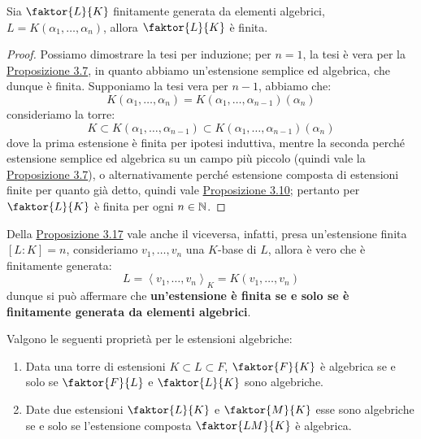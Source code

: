 \documentclass[11pt]{scrartcl}
\begin{document}
\begin{proposition}
    \label{3.17}
    Sia $\faktor{L}{K}$ finitamente generata da elementi algebrici, $L = K(\alpha_1,\ldots,\alpha_n)$, allora $\faktor{L}{K}$ è finita.
\end{proposition}

\begin{proof}
    Possiamo dimostrare la tesi per induzione; per $n = 1$, la tesi è vera per la \hyperref[3.7]{Proposizione 3.7}, in quanto abbiamo un'estensione semplice ed algebrica, che dunque è finita. Supponiamo la tesi vera per $n-1$, abbiamo che:
    \[ K(\alpha_1,\ldots,\alpha_n) = K(\alpha_1,\ldots,\alpha_{n-1})(\alpha_n)
        \]
    consideriamo la torre:
    \[ K \subset K(\alpha_1,\ldots,\alpha_{n-1}) \subset K(\alpha_1,\ldots,\alpha_{n-1})(\alpha_n)
        \]
    dove la prima estensione è finita per ipotesi induttiva, mentre la seconda perché estensione semplice ed algebrica su un campo più piccolo (quindi vale la \hyperref[3.7]{Proposizione 3.7}), o alternativamente perché estensione composta di estensioni finite per quanto già detto, 
    quindi vale \hyperref[3.10]{Proposizione 3.10}; pertanto per $\faktor{L}{K}$ è finita per ogni $n \in \mathbb N$.
\end{proof}

\pagebreak
\begin{remark}
    \label{3.18}
    Della \hyperref[3.17]{Proposizione 3.17} vale anche il viceversa, infatti, presa un'estensione finita $[L:K] = n$, consideriamo $v_1,\ldots,v_n$ una $K$-base di $L$, allora 
    è vero che è finitamente generata:
    \[ L = \left<v_1,\ldots,v_n\right>_K = K(v_1,\ldots,v_n)
        \]
    dunque si può affermare che \textbf{un'estensione è finita se e solo se è finitamente generata da elementi algebrici}.
\end{remark}

\begin{proposition}
    \label{3.19}
    Valgono le seguenti proprietà per le estensioni algebriche:
    \begin{enumerate}[(1)]
        \item Data una torre di estensioni $K \subset L \subset F$, $\faktor{F}{K}$ è algebrica se e solo se $\faktor{F}{L}$ e $\faktor{L}{K}$ sono algebriche.
        \item Date due estensioni $\faktor{L}{K}$ e $\faktor{M}{K}$ esse sono algebriche se e solo se l'estensione composta $\faktor{LM}{K}$ è algebrica.
    \end{enumerate}
\end{proposition}
\end{document}
